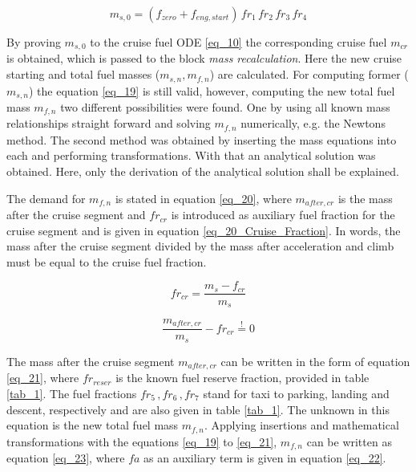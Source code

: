\begin{equation}
    \label{eq_19}
    m_{s,0} = \left(f_{zero} + f_{eng,start}\right) \, fr_1 \, fr_2\,fr_3 \, fr_4
\end{equation}



By proving $m_{s,0}$ to the cruise fuel ODE 
\eqref{eq_10} the corresponding cruise fuel $m_{cr}$ is 
obtained, which is passed to the block \emph{mass recalculation}.
Here the new cruise starting and total fuel masses 
($m_{s,n}, m_{f,n}$) are calculated. For computing 
former ($m_{s,n}$) the equation \eqref{eq_19} is still 
valid, however, computing the new total fuel mass $m_{f,n}$
two different possibilities were found. One by using all 
known mass relationships straight forward and solving $m_{f,n}$ 
numerically, e.g. the Newtons method. The second 
method was obtained by inserting the 
mass equations into each and 
performing transformations. With that 
an analytical solution was obtained. Here, only 
the derivation of the analytical solution shall 
be explained.\newline 

The demand for  
$m_{f,n}$ is stated in equation \eqref{eq_20}, where 
$m_{after,cr}$ is the mass after
the cruise segment and $ fr_{cr}$ is introduced as auxiliary
fuel fraction 
for the cruise segment and is given 
in equation \eqref{eq_20_Cruise_Fraction}. In words, the mass after 
the cruise segment divided by the mass after acceleration 
and climb must be equal to the cruise fuel fraction.


\begin{equation}
    \label{eq_20_Cruise_Fraction}
    fr_{cr} =  \frac{m_s - f_{cr}}{m_s}
\end{equation}

\begin{equation}
    \label{eq_20}
    \frac{m_{after,cr}}{m_{s} }- fr_{cr} \overset{!}{=} 0
\end{equation}

The mass after the cruise segment $m_{after,cr}$
 can be written in 
the form of equation \eqref{eq_21}, where 
$fr_{reser}$ is the known fuel reserve fraction, 
provided in table 
\ref{tab_1}. The fuel fractions 
$fr_5\,, fr_6\, , fr_7$ stand for taxi to parking,
landing and descent, respectively and are also 
given in table \ref{tab_1}. The unknown
in this equation is the new total fuel mass 
$m_{f,n}$. Applying insertions and mathematical 
transformations with the equations \eqref{eq_19} to 
\eqref{eq_21}, $m_{f,n}$ can be written as 
equation \eqref{eq_23}, where $fa$ as an 
auxiliary term is given in equation \eqref{eq_22}.


